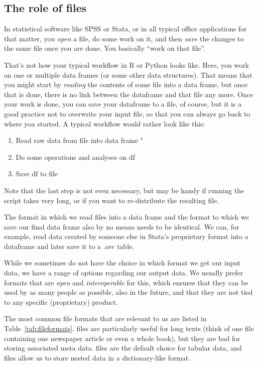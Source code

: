 \subsection{The role of files}

In statistical software like SPSS or Stata, or in all typical office applications for that matter, you \emph{open} a file, do some work on it, and then \emph{save} the changes to the same file once you are done. You basically ``work on that file''.

That's not how your typical workflow in R or Python looks like. Here, you work on one or multiple data frames (or some other data structures). That means that you might start by \emph{reading} the contents of some file into a data frame, but once that is done, there is no link between the dataframe and that file any more. Once your work is done, you can save your dataframe to a file, of course, but it is a good practice not to overwrite your input file, so that you can always go back to where you started. A typical workflow would rather look like this:
\begin{enumerate}
\item Read raw data from file  into data frame "
\item Do some operations and analyses on df
\item Save df to file 
\end{enumerate}
Note that the last step is not even necessary, but may be handy if running the script takes very long, or if you want to re-distribute the resulting file.

The format in which we read files into a data frame and the format to which we save our final data frame also by no means needs to be identical. We can, for example, read data created by someone else in Stata's proprietary  format into a dataframe and later save it to a .csv table.

While we sometimes do not have the choice in which format we get our input data, we have a range of options regarding our output data. We usually prefer formats that are \emph{open} and \emph{interoperable} for this, which ensures that they can be used by as many people as possible, also in the future, and that they are not tied to any specific (proprietary) product.

The most common file formats that are relevant to us are listed in Table~\ref{tab:fileformats}.  files are particularly useful for long texts (think of one file containing one newspaper article or even a whole book), but they are bad for storing associated meta data.  files are the default choice for tabular data, and  files allow us to store nested data in a dictionary-like format. 

